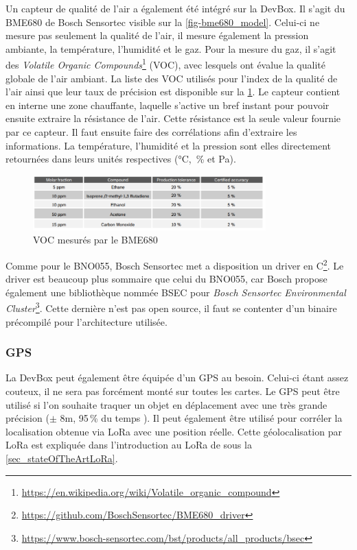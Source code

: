 Un capteur de qualité de l'air a également été intégré sur la DevBox. Il s'agit du BME680 de Bosch Sensortec visible sur la \cref{fig-bme680_model}. Celui-ci ne mesure pas seulement la qualité de l'air, il mesure également la pression ambiante, la température, l'humidité et le gaz. Pour la mesure du gaz, il s'agit des \textit{Volatile Organic Compounds}\footnote{\url{https://en.wikipedia.org/wiki/Volatile_organic_compound}} (VOC), avec lesquels ont évalue la qualité globale de l'air ambiant. La liste des VOC utilisés pour l'index de la qualité de l'air ainsi que leur taux de précision est disponible sur la \cref{fig-bme680_voc_compounds}. Le capteur contient en interne une zone chauffante, laquelle s'active un bref instant pour pouvoir ensuite extraire la résistance de l'air. Cette résistance est la seule valeur fournie par ce capteur. Il faut ensuite faire des corrélations afin d'extraire les informations. La température, l'humidité et la pression sont elles directement retournées dans leurs unités respectives (°C, \,\% et Pa). 

\begin{figure}[ht!]
    \centering
    \includegraphics[width=0.8\textwidth]{Figures/Hardware/bme680_voc_compounds.png}
    \caption{VOC mesurés par le BME680}
    \label{fig-bme680_voc_compounds}
\end{figure}

Comme pour le BNO055, Bosch Sensortec met a disposition un driver en C\footnote{\url{https://github.com/BoschSensortec/BME680_driver}}. Le driver est beaucoup plus sommaire que celui du BNO055, car Bosch propose également une bibliothèque nommée BSEC pour \textit{Bosch Sensortec Environmental Cluster}\footnote{\url{https://www.bosch-sensortec.com/bst/products/all_products/bsec}}. Cette dernière n'est pas open source, il faut se contenter d'un binaire précompilé pour l'architecture utilisée. 


\subsubsection{GPS}
\label{sec-hardware_gps}

La DevBox peut également être équipée d'un GPS au besoin. Celui-ci étant assez couteux, il ne sera pas forcément monté sur toutes les cartes. Le GPS peut être utilisé si l'on souhaite traquer un objet en déplacement avec une très grande précision ($\pm$ 8m, 95\,\% du temps \cite{GPSgovGP89:online}). Il peut également être utilisé pour corréler la localisation obtenue via LoRa avec une position réelle. Cette géolocalisation par LoRa est expliquée dans l'introduction au LoRa de sous la \cref{sec_stateOfTheArtLoRa}.

